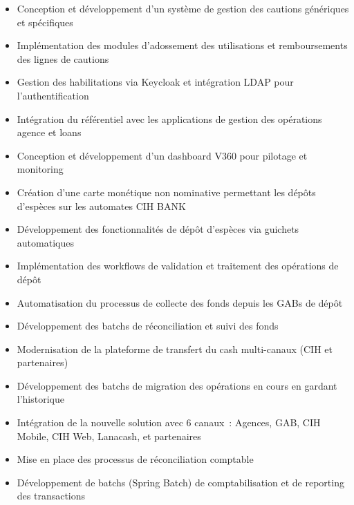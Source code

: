 \begin{itemize}
    \item Conception et développement d'un système de gestion des cautions génériques et spécifiques
    \item Implémentation des modules d'adossement des utilisations et remboursements des lignes de cautions
    \item Gestion des habilitations via Keycloak et intégration LDAP pour l'authentification
    \item Intégration du référentiel avec les applications de gestion des opérations agence et loans
    \item Conception et développement d'un dashboard V360 pour pilotage et monitoring
\end{itemize}

\begin{itemize}
    \item Création d'une carte monétique non nominative permettant les dépôts d'espèces sur les automates CIH BANK
    \item Développement des fonctionnalités de dépôt d'espèces via guichets automatiques
    \item Implémentation des workflows de validation et traitement des opérations de dépôt
\end{itemize}

\begin{itemize}
    \item Automatisation du processus de collecte des fonds depuis les GABs de dépôt
    \item Développement des batchs de réconciliation et suivi des fonds
\end{itemize}

\begin{itemize}
    \item Modernisation de la plateforme de transfert du cash multi-canaux (CIH et partenaires)
    \item Développement des batchs de migration des opérations en cours en gardant l'historique
    \item Intégration de la nouvelle solution avec 6 canaux~: Agences, GAB, CIH Mobile, CIH Web, Lanacash, et partenaires
\end{itemize}

\begin{itemize}
    \item Mise en place des processus de réconciliation comptable
    \item Développement de batchs (Spring Batch) de comptabilisation et de reporting des transactions
\end{itemize}

